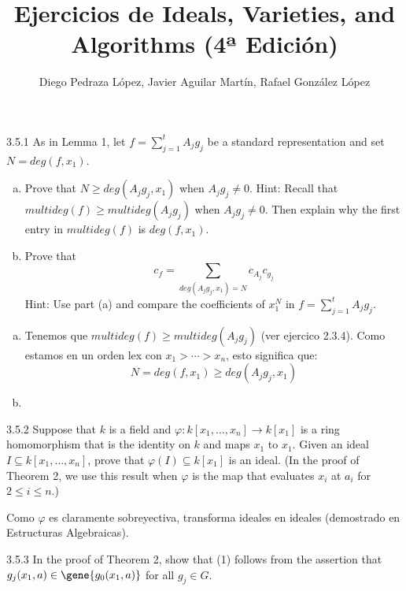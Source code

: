 \documentclass[twoside]{article}
\begin{document}
\title{Ejercicios de Ideals, Varieties, and Algorithms (4ª Edición)}
\author{Diego Pedraza López, Javier Aguilar Martín, Rafael González López}
\maketitle

\begin{ejercicio}{3.5.1}
As in Lemma 1, let $f = \sum_{j=1}^t A_j g_j$ be a standard representation and set $N = deg(f,x_1)$.
\begin{enumerate}[a.]
\item Prove that $N \geq deg(A_j g_j, x_1)$ when $A_j g_j \neq 0$.
Hint: Recall that $multideg(f) \geq multideg(A_j g_j)$ when $A_j g_j \neq 0$.
Then explain why the first entry in $multideg(f)$ is $deg(f,x_1)$.
\item Prove that
\[ c_f = \sum_{deg(A_j g_j, x_1) = N} c_{A_j}c_{g_j} \]
Hint: Use part (a) and compare the coefficients of $x_1^N$ in $f = \sum_{j=1}^t A_j g_j$.
\end{enumerate}
\end{ejercicio}
\begin{solucion}\mbox{}
\begin{enumerate}[(a)]
\item Tenemos que $multideg(f) \geq multideg(A_j g_j)$ (ver ejercico 2.3.4).
Como estamos en un orden lex con $x_1 > \cdots > x_n$, esto significa que:
\[ N = deg(f,x_1) \geq deg(A_j g_j, x_1) \]
\item
\end{enumerate}
\end{solucion}

\newpage

\begin{ejercicio}{3.5.2}
Suppose that $k$ is a field and $\varphi \colon k[x_1,\dots,x_n] \to k[x_1]$ is a ring homomorphism that is the identity on $k$ and maps $x_1$ to $x_1$.
Given an ideal $I \subseteq k[x_1,\dots,x_n]$, prove that $\varphi(I) \subseteq k[x_1]$ is an ideal.
(In the proof of Theorem 2, we use this result when $\varphi$ is the map that evaluates $x_i$ at $a_i$ for $2 \leq i \leq n$.)
\end{ejercicio}
\begin{solucion}
Como $\varphi$ es claramente sobreyectiva, transforma ideales en ideales (demostrado en Estructuras Algebraicas).
\end{solucion}

\newpage

\begin{ejercicio}{3.5.3}
In the proof of Theorem 2, show that (1) follows from the assertion that $g_j(x_1,a) \in \gene{g_0(x_1,a)}$ for all $g_j \in G$.
\end{ejercicio}
\end{document}
